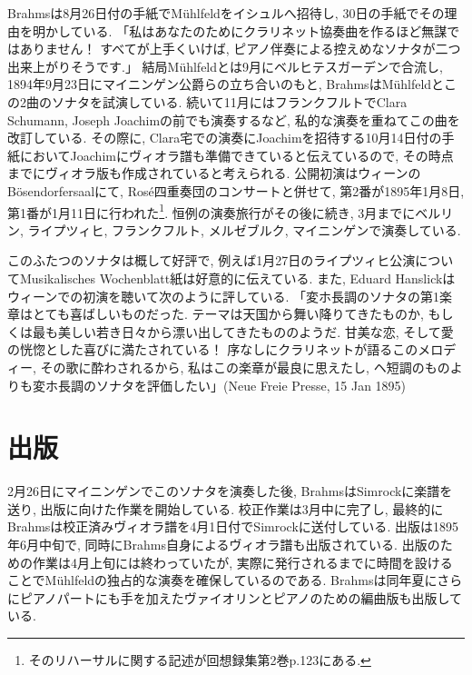 Brahmsは8月26日付の手紙でMühlfeldをイシュルへ招待し, 30日の手紙でその理由を明かしている\cite{henle}.
「私はあなたのためにクラリネット協奏曲を作るほど無謀ではありません！ すべてが上手くいけば, ピアノ伴奏による控えめなソナタが二つ出来上がりそうです.」
結局Mühlfeldとは9月にベルヒテスガーデンで合流し, 1894年9月23日にマイニンゲン公爵らの立ち合いのもと, BrahmsはMühlfeldとこの2曲のソナタを試演している\cite{compos}.
続いて11月にはフランクフルトでClara Schumann, Joseph Joachimの前でも演奏するなど, 私的な演奏を重ねてこの曲を改訂している\cite{henle}.
その際に, Clara宅での演奏にJoachimを招待する10月14日付の手紙においてJoachimにヴィオラ譜も準備できていると伝えているので,
その時点までにヴィオラ版も作成されていると考えられる\cite{henle}.
公開初演はウィーンのBösendorfersaalにて, Rosé四重奏団のコンサートと併せて, 第2番が1895年1月8日,
第1番が1月11日に行われた\footnote{そのリハーサルに関する記述が回想録集第2巻p.123にある.}\cite{library}\cite{henle}.
恒例の演奏旅行がその後に続き, 3月までにベルリン, ライプツィヒ, フランクフルト, メルゼブルク, マイニンゲンで演奏している\cite{compos}.

このふたつのソナタは概して好評で, 例えば1月27日のライプツィヒ公演についてMusikalisches Wochenblatt紙は好意的に伝えている.
また, Eduard Hanslickはウィーンでの初演を聴いて次のように評している\cite{henle}.
「変ホ長調のソナタの第1楽章はとても喜ばしいものだった. テーマは天国から舞い降りてきたものか, もしくは最も美しい若き日々から漂い出してきたもののようだ.
甘美な恋, そして愛の恍惚とした喜びに満たされている！ 序なしにクラリネットが語るこのメロディー, その歌に酔わされるから,
私はこの楽章が最良に思えたし, ヘ短調のものよりも変ホ長調のソナタを評価したい」(Neue Freie Presse, 15 Jan 1895)


\section{出版}

2月26日にマイニンゲンでこのソナタを演奏した後, BrahmsはSimrockに楽譜を送り, 出版に向けた作業を開始している.
校正作業は3月中に完了し, 最終的にBrahmsは校正済みヴィオラ譜を4月1日付でSimrockに送付している\cite{henle}.
出版は1895年6月中旬で, 同時にBrahms自身によるヴィオラ譜も出版されている.
出版のための作業は4月上旬には終わっていたが, 実際に発行されるまでに時間を設けることでMühlfeldの独占的な演奏を確保しているのである\cite{henle}.
Brahmsは同年夏にさらにピアノパートにも手を加えたヴァイオリンとピアノのための編曲版も出版している\cite{imslp}.

